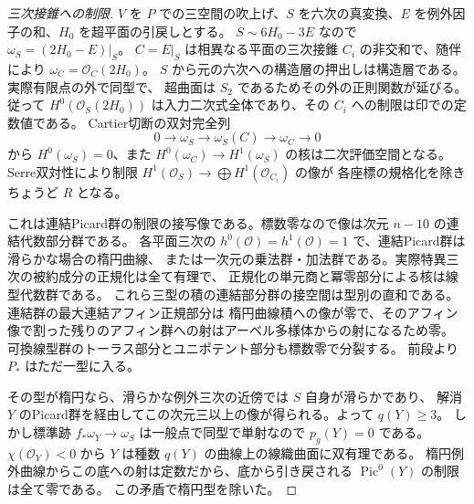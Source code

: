 \begin{proof}[三次接錐への制限]
$V$ を $P$ での三空間の吹上げ、$S$ を六次の真変換、$E$ を例外因子の和、$H_0$ を超平面の引戻しとする。
$S\sim6H_0-3E$ なので $\omega_S=(2H_0-E)|_S$。
$C=E|_S$ は相異なる平面の三次接錐 $C_i$ の非交和で、随伴により $\omega_C=\mathcal O_C(2H_0)$。
$S$ から元の六次への構造層の押出しは構造層である。実際有限点の外で同型で、
超曲面は $S_2$ であるためその外の正則関数が延びる。
従って $H^0(\mathcal O_S(2H_0))$ は入力二次式全体であり、その $C_i$ への制限は印での定数値である。
Cartier切断の双対完全列
\[
 0\longrightarrow\omega_S\longrightarrow\omega_S(C)
   \longrightarrow\omega_C\longrightarrow0
\]
から $H^0(\omega_S)=0$、また $H^0(\omega_C)\to H^1(\omega_S)$ の核は二次評価空間となる。
Serre双対性により制限 $H^1(\mathcal O_S)\to\bigoplus H^1(\mathcal O_{C_i})$ の像が
各座標の規格化を除きちょうど $R$ となる。

これは連結Picard群の制限の接写像である。標数零なので像は次元 $n-10$ の連結代数部分群である。
各平面三次の $h^0(\mathcal O)=h^1(\mathcal O)=1$ で、連結Picard群は滑らかな場合の楕円曲線、
または一次元の乗法群・加法群である。実際特異三次の被約成分の正規化は全て有理で、
正規化の単元商と冪零部分による核は線型代数群である。
これら三型の積の連結部分群の接空間は型別の直和である。連結群の最大連結アフィン正規部分は
楕円曲線積への像が零で、そのアフィン像で割った残りのアフィン群への射はアーベル多様体からの射になるため零。
可換線型群のトーラス部分とユニポテント部分も標数零で分裂する。
前段より $P_*$ はただ一型に入る。

その型が楕円なら、滑らかな例外三次の近傍では $S$ 自身が滑らかであり、
解消 $Y$ のPicard群を経由してこの次元三以上の像が得られる。よって $q(Y)\ge3$。
しかし標準跡 $f_*\omega_Y\to\omega_S$ は一般点で同型で単射なので $p_g(Y)=0$ である。
$\chi(\mathcal O_Y)<0$ から $Y$ は種数 $q(Y)$ の曲線上の線織曲面に双有理である。
楕円例外曲線からこの底への射は定数だから、底から引き戻される $\operatorname{Pic}^0(Y)$ の制限は全て零である。
この矛盾で楕円型を除いた。
\end{proof}
